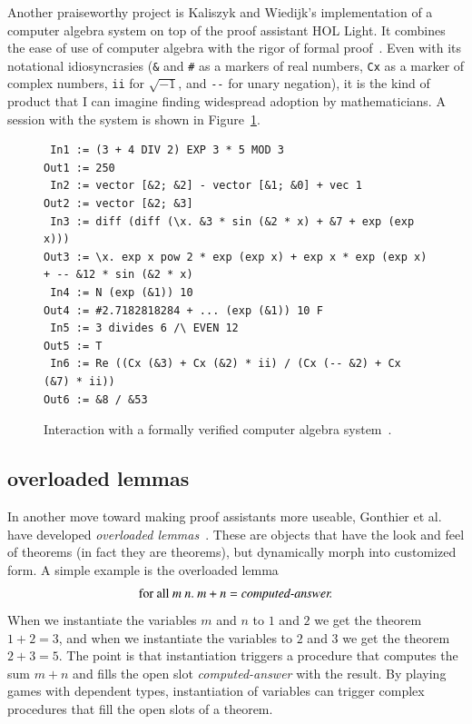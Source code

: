 \documentclass{llncs}
\begin{document}
\smallskip

Another praiseworthy project is Kaliszyk and Wiedijk's implementation
of a computer algebra system on top of the proof assistant HOL Light.
It combines the ease of use of computer algebra with the rigor of
formal proof~\cite{kaliszyk_p04_calc}.  Even with its notational
idiosyncrasies (\verb!&! and \verb!#! as a markers of real numbers,
\verb!Cx! as a marker of complex numbers, \verb!ii! for $\sqrt{-1}$,
and \verb!--! for unary negation), it is the kind of product that I
can imagine finding widespread adoption by mathematicians. A session
with the system is shown in Figure~\ref{fig:kw}.

\begin{figure}
\begin{verbatim}
 In1 := (3 + 4 DIV 2) EXP 3 * 5 MOD 3 
Out1 := 250 
 In2 := vector [&2; &2] - vector [&1; &0] + vec 1 
Out2 := vector [&2; &3] 
 In3 := diff (diff (\x. &3 * sin (&2 * x) + &7 + exp (exp x))) 
Out3 := \x. exp x pow 2 * exp (exp x) + exp x * exp (exp x) + -- &12 * sin (&2 * x) 
 In4 := N (exp (&1)) 10 
Out4 := #2.7182818284 + ... (exp (&1)) 10 F 
 In5 := 3 divides 6 /\ EVEN 12 
Out5 := T 
 In6 := Re ((Cx (&3) + Cx (&2) * ii) / (Cx (-- &2) + Cx (&7) * ii)) 
Out6 := &8 / &53 
\end{verbatim}
\caption{Interaction with a formally verified computer algebra system~\cite{kaliszyk_p04_calc}.}
\label{fig:kw}
\end{figure}


\subsection{overloaded lemmas}


In another move toward making proof assistants more useable, Gonthier
et al.  have developed {\it overloaded lemmas}~\cite{gonHoc}.  These
are objects that have the look and feel of theorems (in fact they are
theorems), but dynamically morph into customized form.  A simple
example is the overloaded lemma
\[
\text{for all}~m~n.~m+n  = \text{\it computed-answer.}
\]
When we instantiate the variables $m$ and $n$ to $1$ and $2$ we get
the theorem $1+2=3$, and when we instantiate the variables to $2$ and
$3$ we get the theorem $2+3=5$.  The point is that instantiation
triggers a procedure that computes the sum $m+n$ and fills the open
slot {\it computed-answer} with the result.  By playing games with
dependent types, instantiation of variables can trigger complex
procedures that fill the open slots of a theorem.
\end{document}
